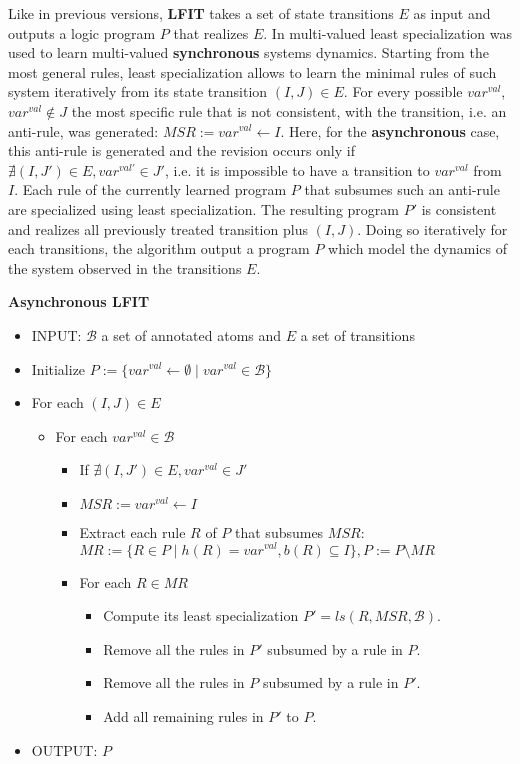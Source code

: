 Like in previous versions, {\bf LFIT} takes a set of state transitions $E$ as input and outputs a logic program $P$ that realizes $E$.
In \cite{DMTRICLP15} multi-valued least specialization was used to learn multi-valued {\bf synchronous} systems dynamics.
Starting from the most general rules, least specialization allows to learn the minimal rules of such system iteratively from its state transition $(I,J) \in E$.
For every possible $var^{val}$, $var^{val} \not \in J$ the most specific rule that is not consistent, with the transition, i.e. an anti-rule, was generated: $MSR := var^{val} \leftarrow I$.
Here, for the {\bf asynchronous} case, this anti-rule is generated and the revision occurs only if $\nexists (I,J') \in E, var^{val'} \in J'$,
i.e. it is impossible to have a transition to $var^{val}$ from $I$.
Each rule of the currently learned program $P$ that subsumes such an anti-rule are specialized using least specialization.
The resulting program $P'$ is consistent and realizes all previously treated transition plus $(I,J)$.
Doing so iteratively for each transitions, the algorithm output a program $P$ which model the dynamics of the system observed in the transitions $E$.

\vspace{0.5em}
\noindent
\textbf{Asynchronous LFIT}
\vspace{-0.4em}
\begin{itemize}
	\item INPUT: $\mathcal{B}$ a set of annotated atoms and $E$ a set of transitions
	\item Initialize $P := \{var^{val} \leftarrow \emptyset \mid var^{val} \in \mathcal{B}\}$
	\item For each $(I,J) \in E$
	\begin{itemize}
		\item For each $var^{val} \in \mathcal{B}$
		\begin{itemize}
			\item If $\nexists (I,J') \in E, var^{val} \in J'$
			\item $MSR := var^{val} \leftarrow I$
			\item Extract each rule $R$ of $P$ that subsumes $MSR$: $MR := \{R \in P \mid h(R) = var^{val}, b(R) \subseteq I\}, P := P \setminus MR$
			\item For each $R \in MR$
			\begin{itemize}
				\item Compute its least specialization $P'=ls(R,MSR,\mathcal{B})$.
				\item Remove all the rules in $P'$ subsumed by a rule in $P$.
				\item Remove all the rules in $P$ subsumed by a rule in $P'$.
				\item Add all remaining rules in $P'$ to $P$.
			\end{itemize}
		\end{itemize}
	\end{itemize}
	\item OUTPUT: $P$
\end{itemize}

